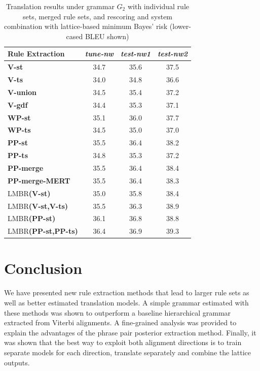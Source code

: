 \begin{table}[thbp]
\begin{center}
\begin{tabular}{|l|c|c|c|}
\hline
Rule Extraction & {\em \footnotesize tune-nw} & {\em \footnotesize test-nw1} & {\em \footnotesize test-nw2} \\ \cline{2-4}
\hline
{\bf V-st}    & 34.7  & 35.6  & 37.5 \\
{\bf V-ts}    & 34.0 & 34.8 & 36.6 \\
{\bf V-union}  & 34.5 & 35.4 & 37.2 \\
{\bf V-gdf}    & 34.4 & 35.3 & 37.1 \\
{\bf WP-st}    & 35.1 & 36.0 & 37.7 \\
{\bf WP-ts}    & 34.5 & 35.0 & 37.0 \\
{\bf PP-st}    & 35.5 & 36.4 & 38.2 \\
{\bf PP-ts}    & 34.8 & 35.3 & 37.2 \\
\hline
{\bf PP-merge}    & 35.5 & 36.4 &  38.4 \\
{\bf PP-merge-MERT}  & 35.5 & 36.4 &  38.3 \\
\hline
LMBR{\bf(V-st)}        & 35.0 & 35.8 & 38.4 \\
LMBR{\bf(V-st,V-ts)}   & 35.5 & 36.3 & 38.9 \\
LMBR{\bf(PP-st)}       & 36.1 & 36.8 & 38.8 \\
LMBR{\bf(PP-st,PP-ts)} & 36.4 & 36.9 & 39.3 \\
\hline
\end{tabular}
\end{center}
\caption{Translation results under grammar $G_2$ with individual rule sets, merged rule sets, and rescoring and system combination with lattice-based minimum Bayes' risk (lower-cased BLEU shown)}
\label{tab:symm}
\end{table}

\section{Conclusion}
\label{sec:extractionFromPosteriorsConclusion}

We have presented new rule extraction methods that lead to larger rule sets as
well as better estimated translation models. A simple grammar estimated with
these methods was shown to outperform a baseline hierarchical grammar extracted
from Viterbi alignments. A fine-grained analysis was provided to explain the
advantages of the phrase pair posterior extraction method. Finally, it was shown
that the best way to exploit both alignment directions is to train separate
models for each direction, translate separately and combine the lattice outputs.

